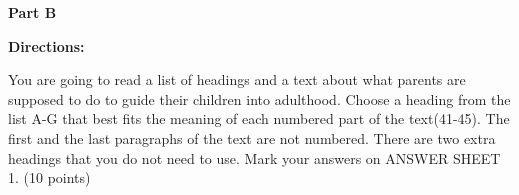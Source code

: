 
\textbf{Part B}

\textbf{Directions:}

You are going to read a list of headings and a text about what parents are supposed to do to guide their children into adulthood. Choose a heading from the list A-G that best fits the meaning of each numbered part of the text(41-45). The first and the last paragraphs of the text are not numbered. There are two extra headings that you do not need to use. Mark your answers on ANSWER SHEET 1. (10 points)

\vspace{6pt}